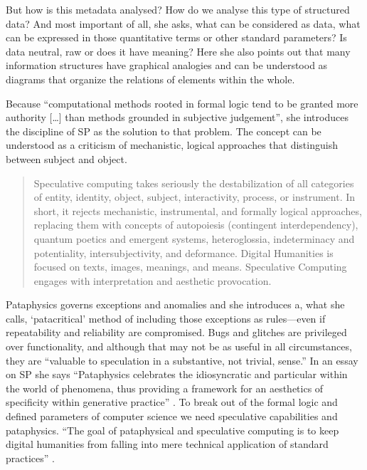 But how is this metadata analysed? How do we analyse this type of structured data? And most important of all, she asks, what can be considered as data, what can be expressed in those quantitative terms or other standard parameters? Is data neutral, raw or does it have meaning? Here she also points out that many information structures have graphical analogies and can be understood as diagrams that organize the relations of elements within the whole.

Because ``computational methods rooted in formal logic tend to be granted more authority [\ldots] than methods grounded in subjective judgement'', she introduces the discipline of \ac{SP} as the solution to that problem. The concept can be understood as a criticism of mechanistic, logical approaches that distinguish between subject and object.

\begin{quotation}
  Speculative computing takes seriously the destabilization of all categories of entity, identity, object, subject, interactivity, process, or instrument. In short, it rejects mechanistic, instrumental, and formally logical approaches, replacing them with concepts of autopoiesis (contingent interdependency), quantum poetics and emergent systems, heteroglossia, indeterminacy and potentiality, intersubjectivity, and deformance. Digital Humanities is focused on texts, images, meanings, and means. Speculative Computing engages with interpretation and aesthetic provocation. 
\end{quotation}

Pataphysics governs exceptions and anomalies and she introduces a, what she calls, `patacritical' method of including those exceptions as rules---even if repeatability and reliability are compromised. Bugs and glitches are privileged over functionality, and although that may not be as useful in all circumstances, they are ``valuable to speculation in a substantive, not trivial, sense.'' In an essay on \ac{SP} she says ``Pataphysics celebrates the idiosyncratic and particular within the world of phenomena, thus providing a framework for an aesthetics of specificity within generative practice'' \autocite{Drucker2007}. To break out of the formal logic and defined parameters of computer science we need speculative capabilities and pataphysics. ``The goal of pataphysical and speculative computing is to keep digital humanities from falling into mere technical application of standard practices'' \autocite*{Drucker2007}.

